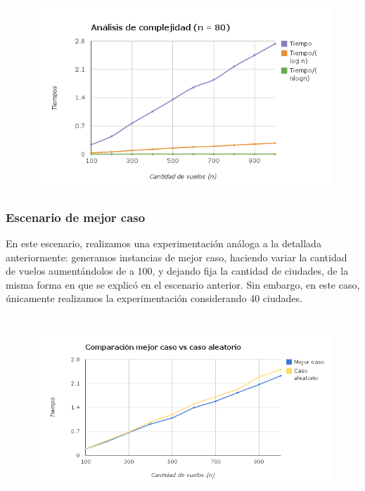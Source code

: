 \documentclass[10pt,a4paper]{article}
\begin{document}
\newpage

	\begin{figure}[h]
		\begin{center}
		   \includegraphics[scale=0.75]{graficos/complejidad_80.png}
		\end{center}
	\end{figure}

\subsubsection{Escenario de mejor caso}

\noindent En este escenario, realizamos una experimentación análoga a la detallada anteriormente: generamos instancias de mejor caso, haciendo variar la cantidad de vuelos aumentándolos de a 100, y dejando fija la cantidad de ciudades, de la misma forma en que se explicó en el escenario anterior. Sin embargo, en este caso, únicamente realizamos la experimentación considerando 40 ciudades. \\\\
	\begin{figure}[h]
		\begin{center}
		   \includegraphics[scale=0.75]{graficos/comparacion_mejorcasoCasoAleatorio.png}
		\end{center}
	\end{figure}
\end{document}
